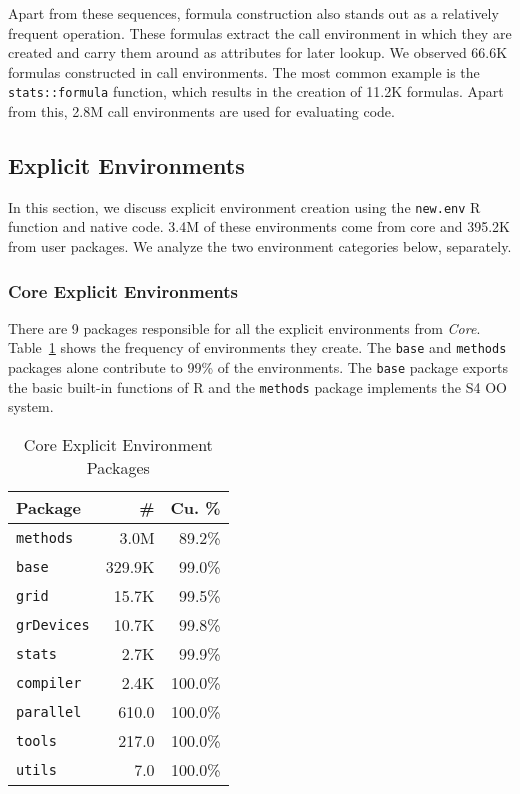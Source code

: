 \documentclass[10pt,review,sigplan,anonymous=true,authorversion=true,nonacm=true]{acmart}
\newcommand{\code}[1]{\lstinline |#1|\xspace}
\newcommand{\newEnv}{\code{new.env}}
\begin{document}
Apart from these sequences, formula construction also stands out as a relatively
frequent operation. These formulas extract the call environment in which they
are created and carry them around as attributes for later lookup. We observed
66.6K formulas constructed in call environments. The most common example is the
\code{stats::formula} function, which results in the creation of 11.2K formulas.
Apart from this, 2.8M call environments are used for evaluating code.


\subsection{Explicit Environments}
In this section, we discuss explicit environment creation using the \newEnv R
function and native code. 3.4M of these environments come from core and 395.2K
from user packages. We analyze the two environment categories below, separately.

\subsubsection{Core Explicit Environments}

There are 9 packages responsible for all the explicit environments from
\emph{Core}. Table~\ref{table:core_explicit_pack} shows the frequency of
environments they create. The \code{base} and \code{methods} packages alone
contribute to 99\% of the environments. The \code{base} package exports the
basic built-in functions of R and the \code{methods} package implements the S4
OO system.

\begin{table}[!h]
  \vspace{-3mm}
  \small
  \caption{Core Explicit Environment Packages} \label{table:core_explicit_pack}
  \centering
  \begin{tabular}{lrr}
    \toprule
    \textbf{Package}&\textbf{\#}&\textbf{Cu. \%}\\
    \midrule
    \code{methods}&3.0M&89.2\%\\
    \code{base}&329.9K&99.0\%\\
    \code{grid}&15.7K&99.5\%\\
    \code{grDevices}&10.7K&99.8\%\\
    \code{stats}&2.7K&99.9\%\\
    \code{compiler}&2.4K&100.0\%\\
    \code{parallel}&610.0&100.0\%\\
    \code{tools}&217.0&100.0\%\\
    \code{utils}&7.0&100.0\%\\
    \bottomrule
  \end{tabular}
\end{table}
\end{document}
